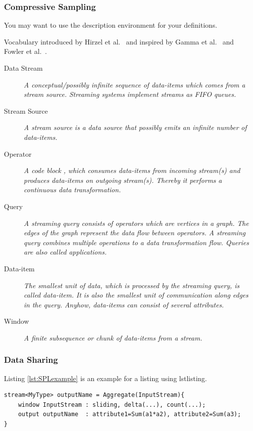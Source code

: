 \subsubsection{Compressive Sampling}

You may want to use the description environment for your definitions.

Vocabulary introduced by Hirzel et al.~\cite{hirzel2014catalog} and inspired by Gamma et al.~\cite{gamma1995} and Fowler et al.~\cite{fowler1999}.

\begin{description}
	\item[Data Stream] \textit{A conceptual/possibly infinite sequence of data-items which comes from a stream source. Streaming systems implement streams as \ac{FIFO} queues.}
	\item[Stream Source] \textit{A stream source is a data source that possibly emits an infinite number of data-items.}
	\item[Operator] \textit{A code block , which consumes data-items from incoming stream(s) and produces data-items on outgoing stream(s). Thereby it performs a continuous data transformation.}
	\item[Query] \textit{A streaming query consists of operators which are vertices in a graph. The edges of the graph represent the data flow between operators. A streaming query combines multiple operations to a data transformation flow. Queries are also called \textit{applications}.}
	\item[Data-item] \textit{The smallest unit of data, which is processed by the streaming query, is called \emph{data-item}. It is also the smallest unit of communication along edges in the query. Anyhow, data-items can consist of several attributes.}
	\item[Window] \textit{A finite subsequence or chunk of data-items from a stream.}
\end{description}

\subsubsection{Data Sharing}
\label{sec:Listings}

Listing \ref{lst:SPLexample} is an example for a listing using lstlisting.

\begin{lstlisting}[float=b,label=lst:SPLexample,caption={An IBM SPL code example}]
stream<MyType> outputName = Aggregate(InputStream){
	window InputStream : sliding, delta(...), count(...);
	output outputName  : attribute1=Sum(a1*a2), attribute2=Sum(a3);
}
\end{lstlisting}

